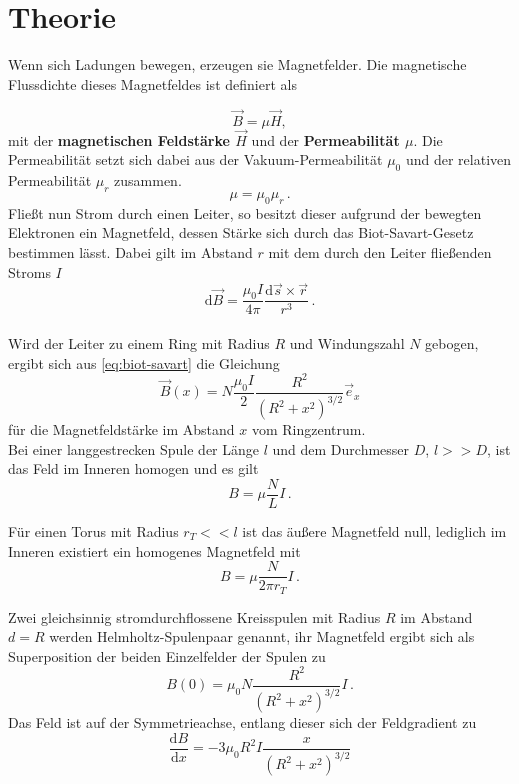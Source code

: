 \section{Theorie}
\label{sec:Theorie}
Wenn sich Ladungen bewegen, erzeugen sie Magnetfelder. Die magnetische Flussdichte
dieses Magnetfeldes ist definiert als

\begin{equation}
    \vec{B}=μ\vec{H},
\end{equation}
mit der \textbf{magnetischen Feldstärke $\vec{H}$} und der \textbf{Permeabilität $μ$}.
Die Permeabilität setzt sich dabei aus der Vakuum-Permeabilität $μ_0$ und der relativen
Permeabilität $μ_r$ zusammen.
\begin{equation}
    μ = μ_0μ_r\,.
\end{equation}
Fließt nun Strom durch einen Leiter, so besitzt dieser aufgrund der bewegten Elektronen
ein Magnetfeld, dessen Stärke sich durch das Biot-Savart-Gesetz bestimmen lässt.
Dabei gilt im Abstand $r$ mit dem durch den Leiter fließenden Stroms $I$
\begin{equation}
    \label{eq:biot-savart}
    \text{d}\vec{B}= \dfrac{μ_0 I}{4π} \dfrac{\text{d}\vec{s} \times \vec{r}}{r^3}\,.
\end{equation}\\

Wird der Leiter zu einem Ring mit Radius $R$ und Windungszahl $N$ gebogen, ergibt sich
aus \eqref{eq:biot-savart} die Gleichung
\begin{equation}
    \vec{B}(x) = N\dfrac{μ_0I}{2}\dfrac{R^2}{(R^2+x^2)^{3/2}} \vec{e}_x
\end{equation}
für die Magnetfeldstärke im Abstand $x$ vom Ringzentrum.\\

Bei einer langgestrecken Spule der Länge $l$ und dem Durchmesser $D$, $l>>D$, ist das Feld im
Inneren homogen und es gilt
\begin{equation}
    B=μ\dfrac{N}{L}I\,.
    \label{LangB}
\end{equation} 

Für einen Torus mit Radius $r_T<<l$ ist das äußere Magnetfeld null, lediglich im Inneren
existiert ein homogenes Magnetfeld mit
\begin{equation}
    B=μ\dfrac{N}{2πr_T}I\,.
    \label{RingB}
\end{equation}

Zwei gleichsinnig stromdurchflossene Kreisspulen mit Radius $R$ im Abstand $d=R$ werden
Helmholtz-Spulenpaar genannt, ihr Magnetfeld ergibt sich als Superposition der beiden
Einzelfelder der Spulen zu
\begin{equation}
    B(0)=μ_0N\dfrac{R^2}{(R^2+x^2)^{3/2}}I\,.
    \label{eq:HelmholtzB}
\end{equation}
Das Feld ist auf der Symmetrieachse, entlang dieser sich der Feldgradient zu
\begin{equation}
    \dfrac{\text{d}B}{\text{d}x} = -3μ_0R^2I\dfrac{x}{(R^2+x^2)^{3/2}}
\end{equation}


